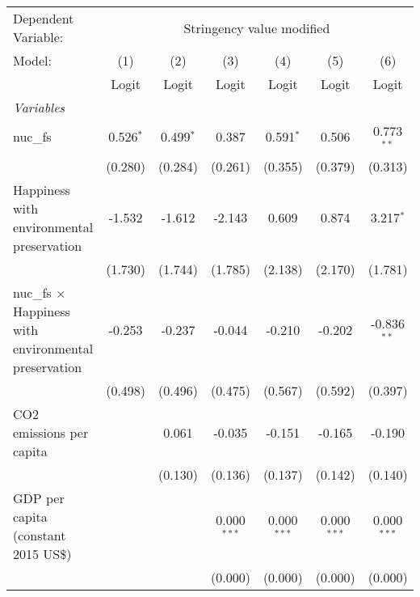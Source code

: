 
\begingroup
\centering
\begin{tabular}{lcccccc}
   \toprule
   Dependent Variable: & \multicolumn{6}{c}{Stringency value modified}\\
   Model:                                                       & (1)         & (2)         & (3)           & (4)           & (5)           & (6)\\  
                                                                &  Logit      & Logit       & Logit         & Logit         & Logit         & Logit\\  
   \midrule
   \emph{Variables}\\
   nuc\_fs                                                      & 0.526$^{*}$ & 0.499$^{*}$ & 0.387         & 0.591$^{*}$   & 0.506         & 0.773$^{**}$\\   
                                                                & (0.280)     & (0.284)     & (0.261)       & (0.355)       & (0.379)       & (0.313)\\   
   Happiness with environmental preservation                    & -1.532      & -1.612      & -2.143        & 0.609         & 0.874         & 3.217$^{*}$\\   
                                                                & (1.730)     & (1.744)     & (1.785)       & (2.138)       & (2.170)       & (1.781)\\   
   nuc\_fs $\times$ Happiness with environmental preservation   & -0.253      & -0.237      & -0.044        & -0.210        & -0.202        & -0.836$^{**}$\\   
                                                                & (0.498)     & (0.496)     & (0.475)       & (0.567)       & (0.592)       & (0.397)\\   
   CO2 emissions per capita                                     &             & 0.061       & -0.035        & -0.151        & -0.165        & -0.190\\   
                                                                &             & (0.130)     & (0.136)       & (0.137)       & (0.142)       & (0.140)\\   
   GDP per capita (constant 2015 US\$)                          &             &             & 0.000$^{***}$ & 0.000$^{***}$ & 0.000$^{***}$ & 0.000$^{***}$\\   
                                                                &             &             & (0.000)       & (0.000)       & (0.000)       & (0.000)\\   

\end{tabular}
